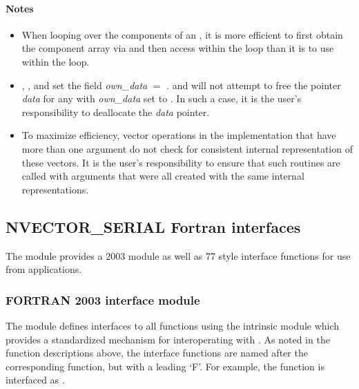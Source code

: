 \paragraph{\bf Notes}

\begin{itemize}

\item
  When looping over the components of an  , it is
  more efficient to first obtain the component array via
   and then access  within the
  loop than it is to use  within the loop.

\item
  {\warn}, ,
  and  set the field
  {\em own\_data} $=$ .
   and 
  will not attempt to free the pointer {\em data} for any  with
  {\em own\_data} set to . In such a case, it is the user's responsibility to
  deallocate the {\em data} pointer.

\item
  {\warn}To maximize efficiency, vector operations in the {\nvecs} implementation
  that have more than one  argument do not check for
  consistent internal representation of these vectors. It is the user's
  responsibility to ensure that such routines are called with 
  arguments that were all created with the same internal representations.

\end{itemize}


\subsection{NVECTOR\_SERIAL Fortran interfaces}
\label{ss:nvec_ser_fortran}

The {\nvecs} module provides a {\F} 2003 module as well as {\F} 77
style interface functions for use from {\F} applications.

\subsubsection*{FORTRAN 2003 interface module}
The  {\F} module defines interfaces to all
{\nvecs} {\CC} functions using the intrinsic 
module which provides a standardized mechanism for interoperating with {\CC}. As
noted in the {\CC} function descriptions above, the interface functions are
named after the corresponding {\CC} function, but with a leading `F'. For
example, the function  is interfaced as
.

